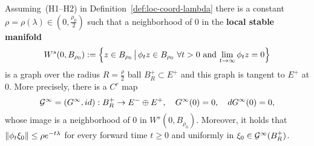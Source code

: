 \documentclass{article}
\begin{document}
\begin{theorem}
\label{thm:loc-st-mf-thm}
Assuming~(H1--H2) in Definition~\ref{def:loc-coord-lambda}
there is a constant $\rho=\rho(\lambda)\in(0,\frac{\rho_0}{2})$ such that
a neighborhood of $0$ in the {\bf local stable manifold}
\begin{equation}\label{eq:loc-stab-mf}
     W^s(0,B_{\rho_0})
     :=\Bigl\{ z\in B_{\rho_0}\,\big|\,
     \text{$\phi_t z\in B_{\rho_0}$ $\forall t>0$ and
     $\lim_{t\to\infty}\phi_t z=0$}
     \Bigr\}
\end{equation}
is a graph over the radius $R=\frac{\rho}{2}$ ball $B^+_R\subset E^+$ and this graph is
tangent to $E^+$ at $0$. More precisely, there is a $C^r$ map
\begin{equation}\label{eq:graph-G}
     \Gg^\infty
     =\left(G^\infty,id \right)
     :B^+_R\to E^-\oplus E^+
     ,\quad
     G^\infty(0)=0
     ,\quad
     dG^\infty(0)=0,
\end{equation}
whose image is a neighborhood of $0$ in $W^s(0,B_{\rho_0})$. Moreover, it holds that
$
     \left\|\phi_t\xi_0\right\|\le \rho e^{-t\lambda}
$
for every forward time $t\ge 0$ and uniformly in $\xi_0\in{\mathcal{G}}^\infty(B^+_R)$.
\end{theorem}
\end{document}
